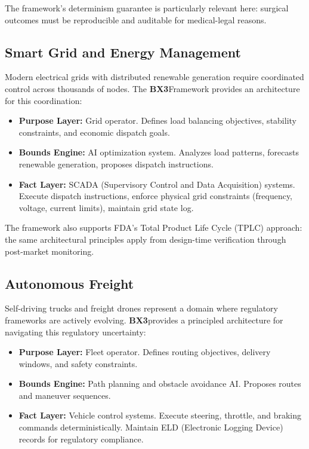 \documentclass[12pt]{article}
\newcommand{\bxthree}{\textbf{BX3}}
\begin{document}
The framework's determinism guarantee is particularly relevant here: surgical outcomes must be reproducible and auditable for medical-legal reasons.

\subsection{Smart Grid and Energy Management}
Modern electrical grids with distributed renewable generation require coordinated control across thousands of nodes. The \bxthree Framework provides an architecture for this coordination:

\begin{itemize}
\item \textbf{Purpose Layer:} Grid operator. Defines load balancing objectives, stability constraints, and economic dispatch goals.
\item \textbf{Bounds Engine:} AI optimization system. Analyzes load patterns, forecasts renewable generation, proposes dispatch instructions.
\item \textbf{Fact Layer:} SCADA (Supervisory Control and Data Acquisition) systems. Execute dispatch instructions, enforce physical grid constraints (frequency, voltage, current limits), maintain grid state log.
\end{itemize}

The framework also supports FDA's Total Product Life Cycle (TPLC) approach: the same architectural principles apply from design-time verification through post-market monitoring.

\subsection{Autonomous Freight}
Self-driving trucks and freight drones represent a domain where regulatory frameworks are actively evolving. \bxthree provides a principled architecture for navigating this regulatory uncertainty:

\begin{itemize}
\item \textbf{Purpose Layer:} Fleet operator. Defines routing objectives, delivery windows, and safety constraints.
\item \textbf{Bounds Engine:} Path planning and obstacle avoidance AI. Proposes routes and maneuver sequences.
\item \textbf{Fact Layer:} Vehicle control systems. Execute steering, throttle, and braking commands deterministically. Maintain ELD (Electronic Logging Device) records for regulatory compliance.
\end{itemize}
\end{document}
